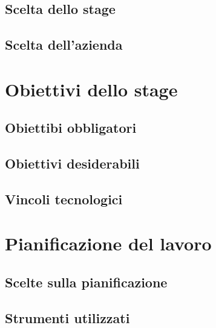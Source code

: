    \subsection{Scelta dello stage}

   \subsection{Scelta dell'azienda}

\section{Obiettivi dello stage}

   \subsection{Obiettibi obbligatori}

   \subsection{Obiettivi desiderabili}

   \subsection{Vincoli tecnologici}

\section{Pianificazione del lavoro}

   \subsection{Scelte sulla pianificazione}

   \subsection{Strumenti utilizzati}